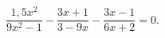 \begin{ex}[type=equation]
	\begin{condition}
		$\dfrac{1,5x^2}{9x^2 - 1} - \dfrac{3x + 1}{3 - 9x} - \dfrac{3x - 1}{6x + 2} = 0.$
	\end{condition}
\end{ex}